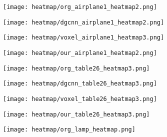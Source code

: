 \documentclass{article}
\begin{document}
\begin{figure}[tbp]
	\centering
	\begin{subfigure}{.24\textwidth}
		\centering
		\texttt{[image: heatmap/org\_airplane1\_heatmap2.png]}
		\caption{}
		\label{fig:sub_1}
	\end{subfigure}\begin{subfigure}{.24\textwidth}
		\centering
		\texttt{[image: heatmap/dgcnn\_airplane1\_heatmap2.png]}
		\caption{}
		\label{fig:sub_2}
    \end{subfigure}\begin{subfigure}{.24\textwidth}
		\centering
		\texttt{[image: heatmap/voxel\_airplane1\_heatmap3.png]}
		\caption{}
		\label{fig:sub3}
	\end{subfigure}\begin{subfigure}{.24\textwidth}
		\centering
		\texttt{[image: heatmap/our\_airplane1\_heatmap2.png]}
		\caption{}
		\label{fig:sub4}
	\end{subfigure}
	\begin{subfigure}{.24\textwidth}
		\centering
		\texttt{[image: heatmap/org\_table26\_heatmap3.png]}
		\caption{}
		\label{fig:sub5}
    \end{subfigure}\begin{subfigure}{.24\textwidth}
		\centering
		\texttt{[image: heatmap/dgcnn\_table26\_heatmap3.png]}
		\caption{}
		\label{fig:sub6}
    \end{subfigure}\begin{subfigure}{.24\textwidth}
		\centering
		\texttt{[image: heatmap/voxel\_table26\_heatmap3.png]}
		\caption{}
		\label{fig:sub7}
	\end{subfigure}\begin{subfigure}{.24\textwidth}
		\centering
		\texttt{[image: heatmap/our\_table26\_heatmap3.png]}
		\caption{}
		\label{fig:sub8}
    \end{subfigure}
    	\begin{subfigure}{.24\textwidth}
		\centering
		\texttt{[image: heatmap/org\_lamp\_heatmap.png]}
		\caption{}
		\label{fig:sub9}
	\end{subfigure}\begin{subfigure}{.24\textwidth}

\end{subfigure}
\end{figure}
\end{document}
